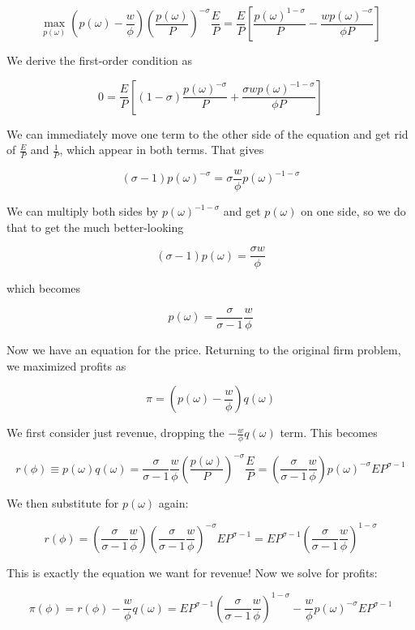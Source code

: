 \documentclass[12pt, letterpaper]{article}
\begin{document}
	\[ \max_{p(\omega)} \left( p(\omega) - \frac{w}{\phi} \right) \left(\frac{p(\omega)}{P}\right)^{-\sigma} \frac{E}{P} = \frac{E}{P} \left[ \frac{p(\omega)^{1 - \sigma}}{P} - \frac{w p(\omega)^{-\sigma}}{\phi P} \right]  \]

	We derive the first-order condition as

	\[ 0 = \frac{E}{P} \left[ (1 - \sigma) \frac{p(\omega)^{-\sigma}}{P} + \frac{\sigma w p(\omega)^{-1 - \sigma}}{\phi P} \right]      \]

	We can immediately move one term to the other side of the equation and get rid of \(\frac{E}{P}\) and \(\frac{1}{P}\), which appear in both terms. That gives

	\[ (\sigma - 1) p(\omega)^{-\sigma} = \sigma \frac{w}{\phi} p(\omega)^{-1 - \sigma}    \]

	We can multiply both sides by \(p(\omega)^{- 1 - \sigma}\) and get \(p(\omega)\) on one side, so we do that to get the much better-looking 
	
	\[ (\sigma - 1) p(\omega) = \frac{\sigma w}{\phi}   \]

	which becomes

	\[ p(\omega) = \frac{\sigma}{\sigma - 1} \frac{w}{\phi}    \]

	Now we have an equation for the price. Returning to the original firm problem, we maximized profits as

	\[ \pi = \left( p(\omega) - \frac{w}{\phi} \right)  q(\omega)    \]

	We first consider just revenue, dropping the \(- \frac{w}{\phi} q(\omega)\) term. This becomes

	\[ r(\phi) \equiv p(\omega) q(\omega) = \frac{\sigma}{\sigma - 1} \frac{w}{\phi} \left(\frac{p(\omega)}{P}\right)^{-\sigma} \frac{E}{P} = \left( \frac{\sigma}{\sigma - 1} \frac{w}{\phi} \right) p(\omega)^{-\sigma} EP^{\sigma - 1}   \]

	We then substitute for \(p(\omega)\) again:

	\[ r(\phi) = \left( \frac{\sigma}{\sigma - 1} \frac{w}{\phi} \right) \left( \frac{\sigma}{\sigma - 1} \frac{w}{\phi} \right)^{-\sigma} EP^{\sigma - 1} = EP^{\sigma - 1} \left( \frac{\sigma}{\sigma - 1} \frac{w}{\phi} \right)^{1 - \sigma}    \]

	This is exactly the equation we want for revenue! Now we solve for profits:

	\[ \pi(\phi) = r(\phi) - \frac{w}{\phi}  q(\omega) = EP^{\sigma - 1} \left( \frac{\sigma}{\sigma - 1} \frac{w}{\phi} \right)^{1 - \sigma} - \frac{w}{\phi} p(\omega)^{-\sigma} E P^{\sigma - 1}   \]
\end{document}
